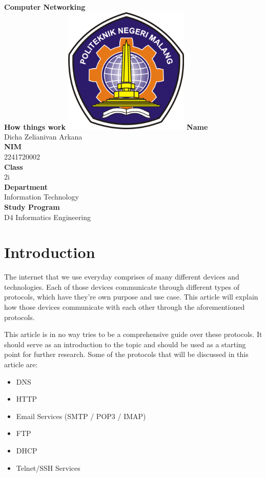 \documentclass[12pt,titlepage]{article}
\newcommand{\vSubject}{Computer Networking}
\newcommand{\vSubtitle}{How things work}
\newcommand{\vName}{Dicha Zelianivan Arkana}
\newcommand{\vNIM}{2241720002}
\newcommand{\vClass}{2i}
\newcommand{\vDepartment}{Information Technology}
\newcommand{\vStudyProgram}{D4 Informatics Engineering}
\begin{document}
\begin{titlepage}
    \centering
    \vfill
    {\bfseries\LARGE
        \vSubject\\
        \vskip0.25cm
        \vSubtitle
    }
    \vfill
    \includegraphics[width=6cm]{images/polinema-logo.png}
    \vfill
    {
        \textbf{Name}\\
        \vName\\
        \vskip0.5cm
        \textbf{NIM}\\
        \vNIM\\
        \vskip0.5cm
        \textbf{Class}\\
        \vClass\\
        \vskip0.5cm
        \textbf{Department}\\
        \vDepartment\\
        \vskip0.5cm
        \textbf{Study Program}\\
        \vStudyProgram
    }
\end{titlepage}

\tableofcontents

\pagebreak

\section{Introduction}

The internet that we use everyday comprises of many different devices and technologies. Each of those
devices communicate through different types of protocols, which have they're own purpose and use case.
This article will explain how those devices communicate with each other through the aforementioned protocols.

This article is in no way tries to be a comprehensive guide over these protocols. It should serve as an introduction
to the topic and should be used as a starting point for further research. Some of the protocols
that will be discussed in this article are:
\begin{itemize}
    \item DNS
    \item HTTP
    \item Email Services (SMTP / POP3 / IMAP)
    \item FTP
    \item DHCP
    \item Telnet/SSH Services
\end{itemize}
\end{document}
